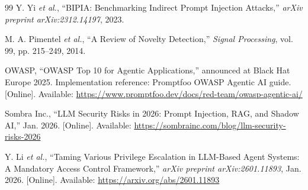 \documentclass[journal]{IEEEtran}
\begin{document}
\begin{thebibliography}{99}
Y. Yi \textit{et al.}, ``BIPIA: Benchmarking Indirect Prompt Injection Attacks,'' \textit{arXiv preprint arXiv:2312.14197}, 2023.

M. A. Pimentel \textit{et al.}, ``A Review of Novelty Detection,'' \textit{Signal Processing}, vol. 99, pp. 215--249, 2014.

OWASP, ``OWASP Top 10 for Agentic Applications,'' announced at Black Hat Europe 2025. Implementation reference: Promptfoo OWASP Agentic AI guide. [Online]. Available: \url{https://www.promptfoo.dev/docs/red-team/owasp-agentic-ai/}

Sombra Inc., ``LLM Security Risks in 2026: Prompt Injection, RAG, and Shadow AI,'' Jan. 2026. [Online]. Available: \url{https://sombrainc.com/blog/llm-security-risks-2026}

Y. Li \textit{et al.}, ``Taming Various Privilege Escalation in LLM-Based Agent Systems: A Mandatory Access Control Framework,'' \textit{arXiv preprint arXiv:2601.11893}, Jan. 2026. [Online]. Available: \url{https://arxiv.org/abs/2601.11893}

\end{thebibliography}


\end{document}
